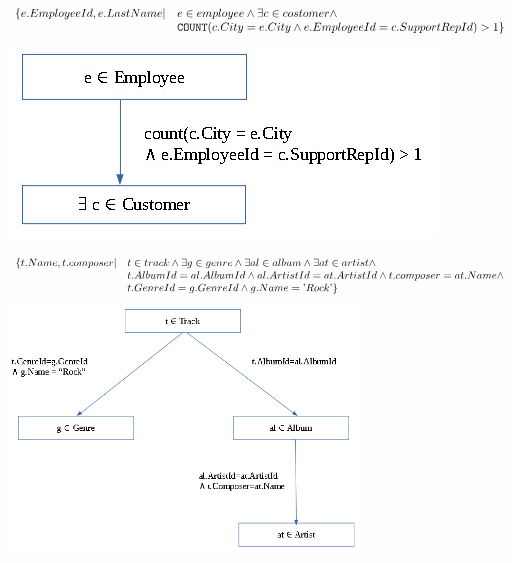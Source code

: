 \begin{exercise}{6}

\begin{subexercise}
  \begin{displaymath}
    \begin{array}{l l}
      \{ e.EmployeeId, e.LastName | & e \in employee \land \exists c \in costomer \land\\
              & \text{\texttt{COUNT}}( c.City = e.City \land e.EmployeeId =
              c.SupportRepId ) > 1 \}
    \end{array}
  \end{displaymath}
  \includegraphics{ueb03/2a.jpg}
\end{subexercise}

\begin{subexercise}
  \begin{displaymath}
    \begin{array}{l l}
      \{ t.Name, t.composer | &t \in track \land \exists g\in genre \land
      \exists al\in album
      \land \exists at \in artist \land \\
            & t.AlbumId = al.AlbumId \land al.ArtistId = at.ArtistId \land
                t.composer = at.Name \land \\
            & t.GenreId = g.GenreId \land g.Name = \text{'}Rock\text{'}
        \}
    \end{array}
  \end{displaymath}
  \includegraphics[width=0.7\textwidth]{ueb03/2b.png}
\end{subexercise}
\end{exercise}
